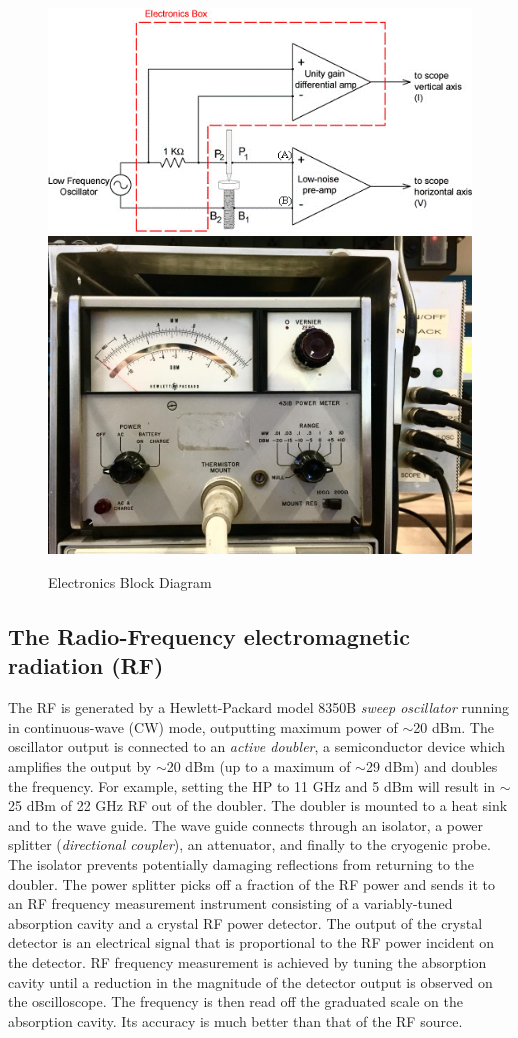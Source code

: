 \documentclass{../lab}
\begin{document}
\begin{figure}[h]
    \href{http://experimentationlab.berkeley.edu/sites/default/files/images/JOS7.gif}{\includegraphics[width=0.6\linewidth]{images/JOS7.png}}\hfill
    \href{http://experimentationlab.berkeley.edu/sites/default/files/JOS/image.jpeg}{\includegraphics[width=0.39\linewidth]{images/image.jpg}}
    \caption{Electronics Block Diagram}
    \label{fig:ElectronicsBlockDiagram}
\end{figure}

\subsection{The Radio-Frequency electromagnetic radiation (RF)}

The RF is generated by a Hewlett-Packard model 8350B \emph{sweep oscillator} running in continuous-wave (CW) mode, outputting maximum power of $\sim$20 dBm. The oscillator output is connected to an \emph{active doubler}, a semiconductor device which amplifies the output by $\sim$20 dBm (up to a maximum of $\sim$29 dBm) and doubles the frequency. For example, setting the HP to 11 GHz and 5 dBm will result in $\sim$25 dBm of 22 GHz RF out of the doubler. The doubler is mounted to a heat sink and to the wave guide. The wave guide connects through an isolator, a power splitter (\emph{directional coupler}), an attenuator, and finally to the cryogenic probe. The isolator prevents potentially damaging reflections from returning to the doubler. The power splitter picks off a fraction of the RF power and sends it to an RF frequency measurement instrument consisting of a variably-tuned absorption cavity and a crystal RF power detector. The output of the crystal detector is an electrical signal that is proportional to the RF power incident on the detector. RF frequency measurement is achieved by tuning the absorption cavity until a reduction in the magnitude of the detector output is observed on the oscilloscope. The frequency is then read off the graduated scale on the absorption cavity. Its accuracy is much better than that of the RF source.
\end{document}
